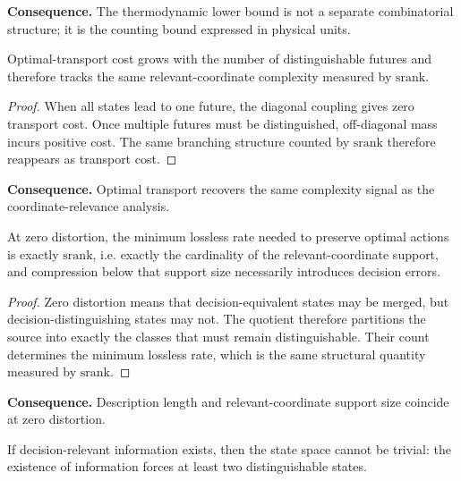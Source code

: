 \noindent\textbf{Consequence.} The thermodynamic lower bound is not a separate combinatorial structure; it is the counting bound expressed in physical units.

\begin{theorem}[Wasserstein Distance = Structural Rank]\label{thm:wasserstein-bridge}
Optimal-transport cost grows with the number of distinguishable futures and therefore tracks the same relevant-coordinate complexity measured by $\mathrm{srank}$.
\end{theorem}

\begin{proof}
When all states lead to one future, the diagonal coupling gives zero transport cost. Once multiple futures must be distinguished, off-diagonal mass incurs positive cost. The same branching structure counted by $\mathrm{srank}$ therefore reappears as transport cost.
\end{proof}

\noindent\textbf{Consequence.} Optimal transport recovers the same complexity signal as the coordinate-relevance analysis.

\begin{theorem}[Rate-Distortion = Structural Rank]\label{thm:rate-distortion-bridge}
At zero distortion, the minimum lossless rate needed to preserve optimal actions is exactly $\mathrm{srank}$, i.e. exactly the cardinality of the relevant-coordinate support, and compression below that support size necessarily introduces decision errors.
\end{theorem}

\begin{proof}
Zero distortion means that decision-equivalent states may be merged, but decision-distinguishing states may not. The quotient therefore partitions the source into exactly the classes that must remain distinguishable. Their count determines the minimum lossless rate, which is the same structural quantity measured by $\mathrm{srank}$.
\end{proof}

\noindent\textbf{Consequence.} Description length and relevant-coordinate support size coincide at zero distortion.

\begin{theorem}\label{thm:nontriviality-counting}
If decision-relevant information exists, then the state space cannot be trivial: the existence of information forces at least two distinguishable states.
\end{theorem}


